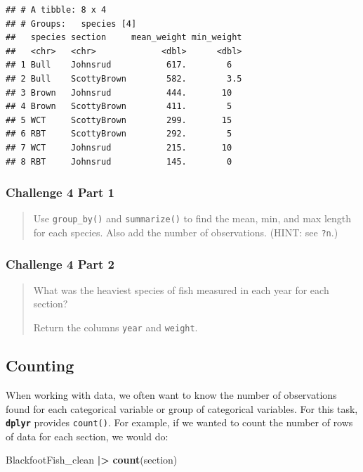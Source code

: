 \documentclass[
  10pt,
  letterpaper,
  twoside,
  openright]{book}
\newenvironment{Shaded}{\begin{snugshade}}{\end{snugshade}}
\newcommand{\FunctionTok}[1]{\textcolor[rgb]{0.13,0.29,0.53}{\textbf{#1}}}
\newcommand{\NormalTok}[1]{#1}
\newcommand{\SpecialCharTok}[1]{\textcolor[rgb]{0.81,0.36,0.00}{\textbf{#1}}}
\begin{document}
\begin{verbatim}
## # A tibble: 8 x 4
## # Groups:   species [4]
##   species section     mean_weight min_weight
##   <chr>   <chr>             <dbl>      <dbl>
## 1 Bull    Johnsrud           617.        6  
## 2 Bull    ScottyBrown        582.        3.5
## 3 Brown   Johnsrud           444.       10  
## 4 Brown   ScottyBrown        411.        5  
## 5 WCT     ScottyBrown        299.       15  
## 6 RBT     ScottyBrown        292.        5  
## 7 WCT     Johnsrud           215.       10  
## 8 RBT     Johnsrud           145.        0
\end{verbatim}

\hypertarget{challenge-4-part-1}{%
\subsubsection{Challenge 4 Part 1}\label{challenge-4-part-1}}

\begin{quote}
Use \texttt{group\_by()} and \texttt{summarize()} to find the mean, min,
and max length for each species. Also add the number of observations.
(HINT: see \texttt{?n}.)
\end{quote}

\hypertarget{challenge-4-part-2}{%
\subsubsection{Challenge 4 Part 2}\label{challenge-4-part-2}}

\begin{quote}
What was the heaviest species of fish measured in each year for each
section?

Return the columns \texttt{year} and \texttt{weight}.
\end{quote}

\hypertarget{counting}{%
\subsection{Counting}\label{counting}}

When working with data, we often want to know the number of observations
found for each categorical variable or group of categorical variables.
For this task, \textbf{\texttt{dplyr}} provides \texttt{count()}. For
example, if we wanted to count the number of rows of data for each
section, we would do:

\begin{Shaded}
\begin{Highlighting}[]
\NormalTok{BlackfootFish\_clean }\SpecialCharTok{|\textgreater{}}
    \FunctionTok{count}\NormalTok{(section) }
\end{Highlighting}
\end{Shaded}
\end{document}
